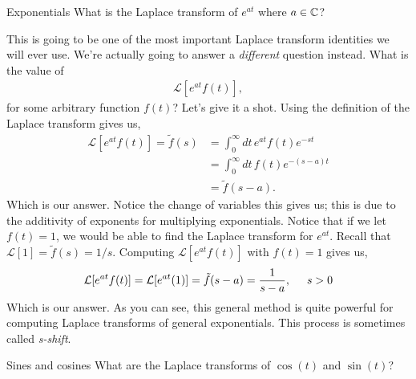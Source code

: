 \documentclass[11pt]{article}
\theoremstyle{mystyle}
\begin{document}
    \begin{psexample}{Exponentials}{}
        What is the Laplace transform of $e^{at}$ where $a \in \mathbb{C}$?
    \end{psexample}
    \begin{pssolution}{}{}
        This is going to be one of the most important Laplace
        transform identities we will ever use.
        We're actually going to answer
        a \emph{different} question instead. What
        is the value of
        \begin{align*}
            \mathcal{L}[e^{at}f(t)],
        \end{align*}
        for some arbitrary function $f(t)$? Let's
        give it a shot. Using the definition of
        the Laplace transform gives us,
        \begin{align*}
            \mathcal{L}[e^{at}f(t)] = \tilde{f}(s) 
            & = \int_0^\infty dt \, e^{at}f(t) e^{-st}\\
            & =  \int_0^\infty dt \, f(t) e^{-(s - a)t}\\
            & = \tilde{f}(s - a).
        \end{align*}
        Which is our answer. Notice the change of variables
        this gives us; this is due to the additivity of exponents
        for multiplying exponentials. Notice that if we let $f(t) = 1$,
        we would be able to find the Laplace transform for $e^{at}$.
        Recall that $\mathcal{L}[1] = \tilde{f}(s) = 1/s$.
        Computing $\mathcal{L}[e^{at}f(t)]$ with $f(t) = 1$
        gives us,
        \begin{align*}
            \mathcal{L}[e^{at}f(t)] = \mathcal{L}[e^{at}(1)]
            = \tilde{f}(s - a) = \frac{1}{s - a}, \hspace{0.5cm} s > 0
        \end{align*}
        Which is our answer. As you can see, this general
        method is quite powerful for computing Laplace transforms
        of general exponentials. This process is sometimes
        called \emph{s-shift}.
    \end{pssolution}
    \begin{psexample}{Sines and cosines}{}
        What are the Laplace transforms of $\cos{(t)}$ and $\sin{(t)}$?
    \end{psexample}
\end{document}

